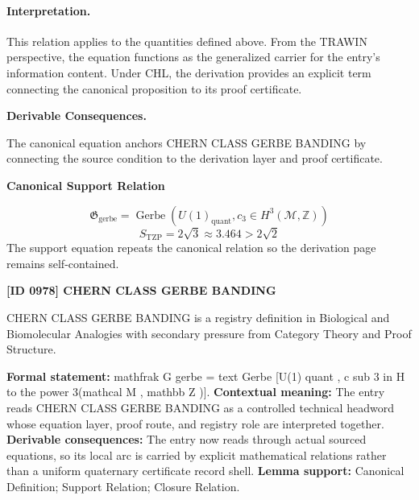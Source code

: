 \paragraph{Interpretation.}
This relation applies to the quantities defined above. From the TRAWIN perspective, the equation functions as the generalized carrier for the entry’s information content. Under CHL, the derivation provides an explicit term connecting the canonical proposition to its proof certificate.

\par\vspace{0.35em}
\noindent\textbf{Derivable Consequences.}\quad
\begingroup
\footnotesize
\raggedright
The canonical equation anchors CHERN CLASS GERBE BANDING by connecting the source condition to the derivation layer and proof certificate.
\par\endgroup

\noindent\textbf{Canonical Support Relation}\par
\[
\mathfrak{G}_{\mathrm{gerbe}}=\operatorname{Gerbe}\!\left(U(1)_{\mathrm{quant}},c_3\in H^3(\mathcal{M},\mathbb{Z})\right)
\]
\[
S_{\mathrm{TZP}}=2\sqrt{3}\approx 3.464>2\sqrt{2}
\]
\noindent The support equation repeats the canonical relation so the derivation page remains self-contained.\par

\clearpage
\noindent\textbf{[ID 0978] CHERN CLASS GERBE BANDING}\par
\vspace{0.35em}
\begingroup\small
{}
CHERN CLASS GERBE BANDING is a registry definition in Biological and Biomolecular Analogies with secondary pressure from Category Theory and Proof Structure.

\begingroup\footnotesize\setlength{\emergencystretch}{3em}\sloppy
\textbf{Formal statement:} mathfrak G gerbe = text Gerbe [U(1) quant , c sub 3 in H to the power 3(mathcal M , mathbb Z )]. \textbf{Contextual meaning:} The entry reads CHERN CLASS GERBE BANDING as a controlled technical headword whose equation layer, proof route, and registry role are interpreted together. \textbf{Derivable consequences:} The entry now reads through actual sourced equations, so its local arc is carried by explicit mathematical relations rather than a uniform quaternary certificate record shell. \textbf{Lemma support:} Canonical Definition; Support Relation; Closure Relation.\par
\endgroup

